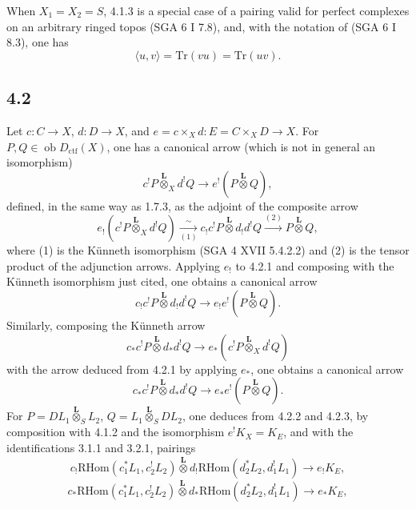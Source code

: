 \documentclass[11pt]{article}
\newcommand{\ob}{\operatorname{ob}}
\providecommand{\RHom}{\mathrm{RHom}}
\providecommand{\Dctf}{D_{\mathrm{ctf}}}
\providecommand{\Dctf}{D_{\mathrm{ctf}}}
\providecommand{\RHom}{\mathrm{RHom}}
\providecommand{\ob}{\operatorname{ob}}
\providecommand{\RHom}{\mathrm R\mathcal{H}om}
\providecommand{\RHom}{\mathrm{RHom}}
\begin{document}
When $X_1=X_2=S$, 4.1.3 is a special case of a pairing valid for perfect complexes on an arbitrary ringed topos (SGA 6 I 7.8), and, with the notation of (SGA 6 I 8.3), one has
\begin{equation}
\langle u,v\rangle=\mathrm{Tr}(vu)=\mathrm{Tr}(uv).
\tag{4.1.5}
\end{equation}

\subsection*{4.2}
Let $c:C\to X$, $d:D\to X$, and $e=c\times_Xd:E=C\times_XD\to X$. For $P,Q\in\ob\Dctf(X)$, one has a canonical arrow (which is not in general an isomorphism)
\begin{equation}
c^!P\overset{\mathbf L}{\otimes}_X d^!Q
\longrightarrow e^!(P\overset{\mathbf L}{\otimes}Q),
\tag{4.2.1}
\end{equation}
defined, in the same way as 1.7.3, as the adjoint of the composite arrow
\[
e_!(c^!P\overset{\mathbf L}{\otimes}_X d^!Q)
\xrightarrow[(1)]{\sim}
 c_!c^!P\overset{\mathbf L}{\otimes}d_!d^!Q
\xrightarrow{(2)} P\overset{\mathbf L}{\otimes}Q,
\]
where (1) is the Künneth isomorphism (SGA 4 XVII 5.4.2.2) and (2) is the tensor product of the adjunction arrows. Applying $e_!$ to 4.2.1 and composing with the Künneth isomorphism just cited, one obtains a canonical arrow
\begin{equation}
c_!c^!P\overset{\mathbf L}{\otimes}d_!d^!Q
\longrightarrow e_!e^!(P\overset{\mathbf L}{\otimes}Q).
\tag{4.2.2}
\end{equation}
Similarly, composing the Künneth arrow
\[
c_*c^!P\overset{\mathbf L}{\otimes}d_*d^!Q
\longrightarrow e_*(c^!P\overset{\mathbf L}{\otimes}_X d^!Q)
\]
with the arrow deduced from 4.2.1 by applying $e_*$, one obtains a canonical arrow
\begin{equation}
c_*c^!P\overset{\mathbf L}{\otimes}d_*d^!Q
\longrightarrow e_*e^!(P\overset{\mathbf L}{\otimes}Q).
\tag{4.2.3}
\end{equation}
For $P=DL_1\overset{\mathbf L}{\otimes}_S L_2$, $Q=L_1\overset{\mathbf L}{\otimes}_S DL_2$, one deduces from 4.2.2 and 4.2.3, by composition with 4.1.2 and the isomorphism $e^!K_X=K_E$, and with the identifications 3.1.1 and 3.2.1, pairings
\begin{equation}
c_!\RHom(c_1^*L_1,c_2^!L_2)\overset{\mathbf L}{\otimes}
 d_!\RHom(d_2^*L_2,d_1^!L_1)
\longrightarrow e_!K_E,
\tag{4.2.4}
\end{equation}
\begin{equation}
c_*\RHom(c_1^*L_1,c_2^!L_2)\overset{\mathbf L}{\otimes}
 d_*\RHom(d_2^*L_2,d_1^!L_1)
\longrightarrow e_*K_E,
\tag{4.2.4'}
\end{equation}
\end{document}
